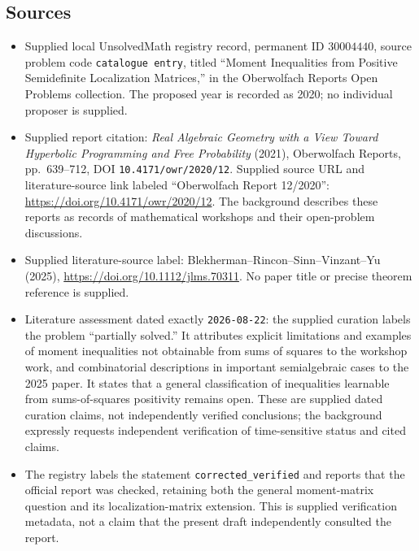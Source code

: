 \documentclass[11pt]{article}
\begin{document}
\subsection{Sources}
\begin{itemize}
\item Supplied local UnsolvedMath registry record, permanent ID \(30004440\), source problem code \texttt{catalogue entry}, titled ``Moment Inequalities from Positive Semidefinite Localization Matrices,'' in the Oberwolfach Reports Open Problems collection. The proposed year is recorded as 2020; no individual proposer is supplied.
\item Supplied report citation: \emph{Real Algebraic Geometry with a View Toward Hyperbolic Programming and Free Probability} (2021), Oberwolfach Reports, pp.\ 639--712, DOI \texttt{10.4171/owr/2020/12}. Supplied source URL and literature-source link labeled ``Oberwolfach Report 12/2020'': \url{https://doi.org/10.4171/owr/2020/12}. The background describes these reports as records of mathematical workshops and their open-problem discussions.
\item Supplied literature-source label: Blekherman--Rincon--Sinn--Vinzant--Yu (2025), \url{https://doi.org/10.1112/jlms.70311}. No paper title or precise theorem reference is supplied.
\item Literature assessment dated exactly \texttt{2026-08-22}: the supplied curation labels the problem ``partially solved.'' It attributes explicit limitations and examples of moment inequalities not obtainable from sums of squares to the workshop work, and combinatorial descriptions in important semialgebraic cases to the 2025 paper. It states that a general classification of inequalities learnable from sums-of-squares positivity remains open. These are supplied dated curation claims, not independently verified conclusions; the background expressly requests independent verification of time-sensitive status and cited claims.
\item The registry labels the statement \texttt{corrected\_verified} and reports that the official report was checked, retaining both the general moment-matrix question and its localization-matrix extension. This is supplied verification metadata, not a claim that the present draft independently consulted the report.
\end{itemize}
\end{document}
